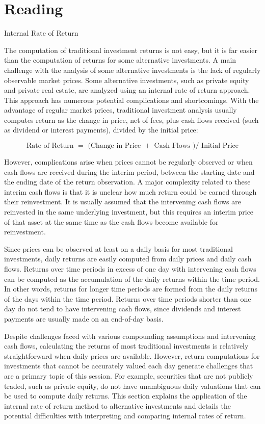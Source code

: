 \documentclass[11pt]{article}
\begin{document}
\section*{Reading}
Internal Rate of Return

The computation of traditional investment returns is not easy, but it is far easier than the computation of returns for some alternative investments. A main challenge with the analysis of some alternative investments is the lack of regularly observable market prices. Some alternative investments, such as private equity and private real estate, are analyzed using an internal rate of return approach. This approach has numerous potential complications and shortcomings. With the advantage of regular market prices, traditional investment analysis usually computes return as the change in price, net of fees, plus cash flows received (such as dividend or interest payments), divided by the initial price:


\begin{equation*}
\text { Rate of Return }=\text { (Change in Price }+ \text { Cash Flows }) / \text { Initial Price } \tag{1}
\end{equation*}


However, complications arise when prices cannot be regularly observed or when cash flows are received during the interim period, between the starting date and the ending date of the return observation. A major complexity related to these interim cash flows is that it is unclear how much return could be earned through their reinvestment. It is usually assumed that the intervening cash flows are reinvested in the same underlying investment, but this requires an interim price of that asset at the same time as the cash flows become available for reinvestment.

Since prices can be observed at least on a daily basis for most traditional investments, daily returns are easily computed from daily prices and daily cash flows. Returns over time periods in excess of one day with intervening cash flows can be computed as the accumulation of the daily returns within the time period. In other words, returns for longer time periods are formed from the daily returns of the days within the time period. Returns over time periods shorter than one day do not tend to have intervening cash flows, since dividends and interest payments are usually made on an end-of-day basis.

Despite challenges faced with various compounding assumptions and intervening cash flows, calculating the returns of most traditional investments is relatively straightforward when daily prices are available. However, return computations for investments that cannot be accurately valued each day generate challenges that are a primary topic of this session. For example, securities that are not publicly traded, such as private equity, do not have unambiguous daily valuations that can be used to compute daily returns. This section explains the application of the internal rate of return method to alternative investments and details the potential difficulties with interpreting and comparing internal rates of return.
\end{document}
